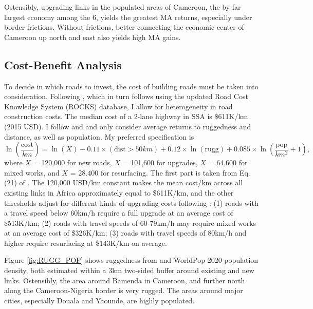 \documentclass[a4paper]{article}
\begin{document}
Ostensibly, upgrading links in the populated areas of Cameroon, the by far largest economy among the 6, yields the greatest MA returns, especially under border frictions. Without frictions, better connecting the economic center of Cameroon up north and east also yields high MA gains.  

\subsection{Cost-Benefit Analysis}

To decide in which roads to invest, the cost of building roads must be taken into consideration. Following \citet{krantz2024optimal}, which in turn follows \citet{collier2016cost} using the updated Road Cost Knowledge System (ROCKS) database, I allow for heterogeneity in road construction costs. The median cost of a 2-lane highway in SSA is \$611K/km (2015 USD). I follow \citet{fajgelbaum2020optimal} and \citet{graff2024spatial} and only consider average returns to ruggedness and distance, as well as population. My preferred specification is 
\begin{equation} \label{eq:COST}
\ln\left(\frac{\text{cost}}{km}\right) = \ln(X) -0.11 \times (\text{dist} > 50km) + 0.12 \times \ln(\text{rugg}) + 0.085 \times \ln\left(\frac{\text{pop}}{km^2}+1\right),
\end{equation}
where $X$ = 120,000 for new roads, $X$ = 101,600 for upgrades, $X$ = 64,600 for mixed works, and $X$ = 28.400 for resurfacing. The first part is taken from Eq. (21) of \citet{fajgelbaum2020optimal}. The 120,000 USD/km constant makes the mean cost/km across all existing links in Africa approximately equal to \$611K/km, and the other thresholds adjust for different kinds of upgrading costs following \citet{krantz2024optimal}: (1) roads with a travel speed below 60km/h require a full upgrade at an average cost of \$513K/km; (2) roads with travel speeds of 60-79km/h may require mixed works at an average cost of \$326K/km; (3) roads with travel speeds of 80km/h and higher require resurfacing at \$143K/km on average. \newline 

Figure \ref{fig:RUGG_POP} shows ruggedness from \citet{nunn2012ruggedness} and WorldPop 2020 population density, both estimated within a 3km two-sided buffer around existing and new links. Ostensibly, the area around Bamenda in Cameroon, and further north along the Cameroon-Nigeria border is very rugged. The areas around major cities, especially Douala and Yaounde, are highly populated. 
\end{document}
